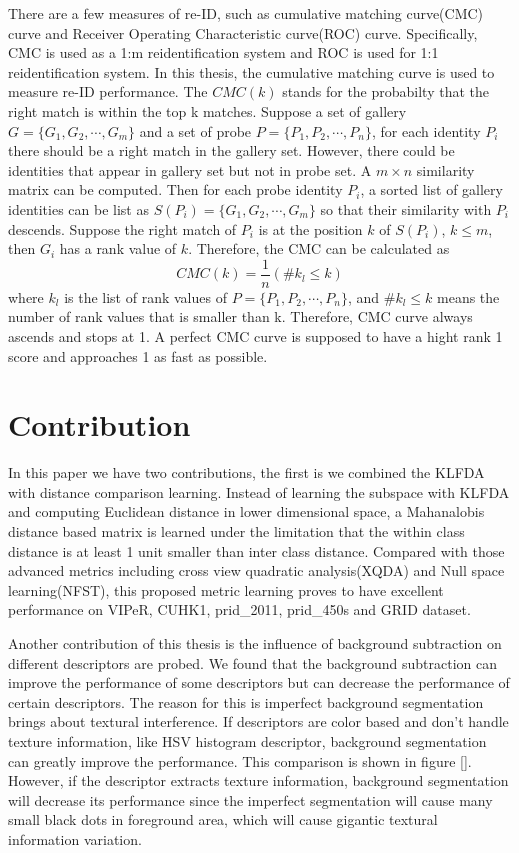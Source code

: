 There are a few measures of re-ID, such as cumulative matching curve(CMC) curve and Receiver Operating Characteristic curve(ROC) curve. Specifically, CMC is used as a 1:m reidentification system and ROC is used for 1:1 reidentification system.  In this thesis, the cumulative matching curve is used to measure re-ID performance. The $CMC(k)$  stands for the probabilty that the right match is within the top k matches. Suppose a set of gallery $G = \{G_1,G_2,\cdots,G_m\}$ and a set of probe $P = \{P_1,P_2,\cdots,P_n\}$, for each identity $P_i$ there should be a right match in the gallery set. However, there could be identities that appear in gallery set but not in probe set. A $m\times n$ similarity matrix can be computed. Then for each probe identity $P_i$, a sorted list of gallery identities can be list as $S(P_i) = \{{G_{1},G_{2},\cdots,G_{m}}\}$ so that their similarity with $P_i$ descends. Suppose the right match of $P_i$ is at the position $k$ of $S(P_i)$, $k\le m$, then $G_i$ has a rank value of $k$. Therefore, the CMC can be calculated as 
\begin{equation}
CMC(k) = \frac{1}{n}(\#k_l\le k)
\end{equation}
where $k_l$ is the list of rank values of $P = \{P_1,P_2,\cdots,P_n\}$, and $\#k_l\le k$ means the number of rank values that is smaller than k.  Therefore, CMC curve always ascends and stops at 1.  A perfect CMC curve is supposed to have a hight rank 1 score and approaches 1 as fast as possible.




\section{Contribution}

In this paper we have two contributions, the first is we combined the KLFDA with distance comparison learning. Instead of learning the subspace with KLFDA and computing Euclidean distance in lower dimensional space, a Mahanalobis distance based matrix is learned under the limitation that the within class distance is at least 1 unit smaller than inter class distance. Compared with those advanced metrics including cross view quadratic analysis(XQDA) \cite{LOMO} and Null space learning(NFST), this proposed metric learning proves to have excellent performance on VIPeR, CUHK1, prid\_2011, prid\_450s and GRID dataset.

Another contribution of this thesis is the influence of background subtraction on different descriptors are probed. We found that the background subtraction can improve the performance of some descriptors but can decrease the performance of  certain descriptors. The reason for this is imperfect background segmentation brings about textural interference. If descriptors are color based and don't handle texture information, like HSV histogram descriptor, background segmentation can greatly improve the performance. This comparison is shown in figure []. However, if the descriptor extracts texture information, background segmentation will decrease its performance since the imperfect segmentation will cause many small black dots in foreground area, which will cause gigantic textural information variation. 



